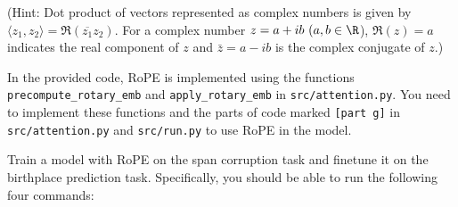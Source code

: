 \begin{parts}
\begin{subparts}
(Hint: Dot product of vectors represented as complex numbers is given by $\langle z_1, z_2 \rangle = \Re(\overline{z_1} z_2)$. For a complex number $z = a + ib\ (a,b\in\R$), $\Re(z) = a$ indicates the real component of $z$ and $\bar{z} = a - ib$ is the complex conjugate of $z$.)



\subpart[8] In the provided code, RoPE is implemented using the functions \texttt{precompute\_rotary\_emb} and \texttt{apply\_rotary\_emb} in \texttt{src/attention.py}. You need to implement these functions and the parts of code marked \texttt{[part g]} in \texttt{src/attention.py} and \texttt{src/run.py} to use RoPE in the model.

Train a model with RoPE on the span corruption task and finetune it on the birthplace prediction task. Specifically, you should be able to run the following four commands:


\end{subparts}
\end{parts}
